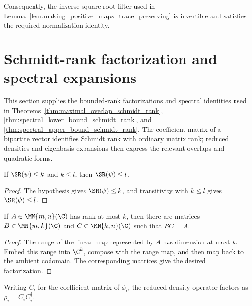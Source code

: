 Consequently, the inverse-square-root filter used in
Lemma~\ref{lem:making_positive_maps_trace_preserving} is invertible and
satisfies the required normalization identity.


\section{Schmidt-rank factorization and spectral expansions}
\label{sec:app_positive_not_cp_schmidt_rank}

This section supplies the bounded-rank factorizations and spectral identities
used in Theorems~\ref{thm:maximal_overlap_schmidt_rank},
\ref{thm:spectral_lower_bound_schmidt_rank}, and
\ref{thm:spectral_upper_bound_schmidt_rank}. The coefficient matrix of a
bipartite vector identifies Schmidt rank with ordinary matrix rank; reduced
densities and eigenbasis expansions then express the relevant overlaps and
quadratic forms.

\begin{lemma}\label{lem:schmidt_rank_mono}
    \leanok
    If $\SR(\psi)\le k$ and $k\le l$, then $\SR(\psi)\le l$.
\end{lemma}

\begin{proof}
    \leanok
    The hypothesis gives $\SR(\psi)\le k$, and transitivity with $k\le l$
    gives $\SR(\psi)\le l$.
\end{proof}

\begin{lemma}
    \label{lem:matrix_rank_factorization_coordinate}
    \leanok
    If $A\in\MN{m,n}(\C)$ has rank at most $k$, then there are matrices
    $B\in\MN{m,k}(\C)$ and $C\in\MN{k,n}(\C)$ such that $BC=A$.
\end{lemma}

\begin{proof}
    \leanok
    The range of the linear map represented by $A$ has dimension at most $k$.
    Embed this range into $\C^k$, compose with the range map, and then map
    back to the ambient codomain. The corresponding matrices give the desired
    factorization.
\end{proof}

\begin{lemma}
    \label{lem:reduced_eig_density_factored}
    \leanok
    Writing $C_i$ for the coefficient matrix of $\phi_i$, the reduced density
    operator factors as $\rho_i=C_iC_i^\dagger$.
\end{lemma}

